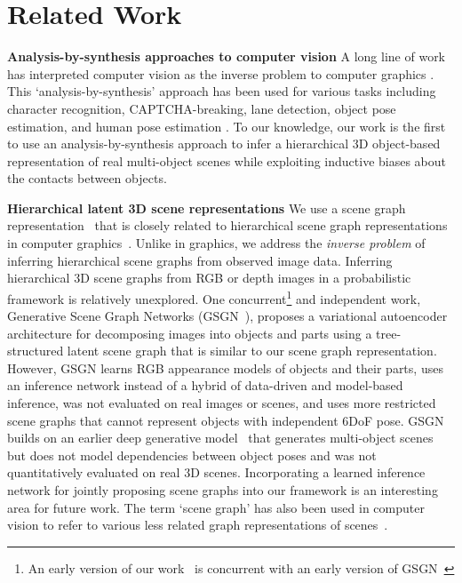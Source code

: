 \section{Related Work}


\textbf{Analysis-by-synthesis approaches to computer vision}
A long line of work has interpreted computer vision as the inverse problem to computer graphics \citep{knill1996introduction, yuille2006vision, lee2003hierarchical, kersten2004object}.
This `analysis-by-synthesis' approach has been used for various tasks including character recognition, CAPTCHA-breaking, lane detection, object pose estimation, and human pose estimation
\citep{zhu1996region, tu2002image, mansinghka2013approximate, moreno2016overcoming, george2017generative, romaszko2017vision}.
To our knowledge, our work is the first to use an analysis-by-synthesis approach to infer a hierarchical 3D object-based representation of real multi-object scenes while exploiting inductive biases about the contacts between objects.

\textbf{Hierarchical latent 3D scene representations} We use a scene
graph representation~\cite{zinberg2019sg} that is closely related to
hierarchical scene graph representations in computer
graphics~\citep{clark1976}.  Unlike in graphics, we address the
\emph{inverse problem} of inferring hierarchical scene graphs from
observed image data.  Inferring hierarchical 3D scene graphs from RGB
or depth images in a probabilistic framework is relatively unexplored.
One concurrent\footnote{An early version of our
  work~\citep{zinberg2019sg} is concurrent with an early version of
  GSGN~\citep{deng2019rich} } and independent work, Generative Scene
Graph Networks (GSGN~\citep{deng2020generative}), proposes a
variational autoencoder architecture for decomposing images into
objects and parts using a tree-structured latent scene graph that is
similar to our scene graph representation.  However, GSGN learns RGB
appearance models of objects and their parts, uses an inference
network instead of a hybrid of data-driven and model-based inference,
was not evaluated on real images or scenes, and uses more restricted
scene graphs that cannot represent objects with independent 6DoF pose.
GSGN builds on an earlier deep generative
model~\citep{eslami2016attend} that generates multi-object scenes but
does not model dependencies between object poses and was not
quantitatively evaluated on real 3D scenes.  Incorporating a learned
inference network for jointly proposing scene graphs into our
framework is an interesting area for future work.  The term `scene
graph' has also been used in computer vision to refer to various less
related graph representations of
scenes~\citep{armeni20193d,chen2019holistic++,rosinol20203d}.




